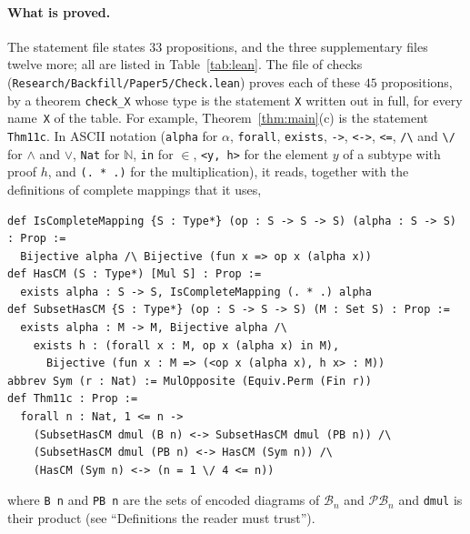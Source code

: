 \documentclass[11pt]{article}
\theoremstyle{remark}
\newcommand{\B}{\mathcal B}
\newcommand{\PB}{\mathcal{PB}}
\begin{document}
\paragraph{What is proved.}
The statement file states $33$ propositions, and the three supplementary files
twelve more; all are listed in Table~\ref{tab:lean}. The file of checks
(\texttt{Research/\allowbreak Backfill/\allowbreak Paper5/\allowbreak Check.lean}) proves each of these $45$
propositions, by a theorem \texttt{check\_X} whose type is the statement
\texttt{X} written out in full, for every name~\texttt{X} of the table. For example,
Theorem~\ref{thm:main}(c) is the statement \texttt{Thm11c}. In ASCII notation
(\verb|alpha| for $\alpha$, \verb|forall|, \verb|exists|, \verb|->|, \verb|<->|, \verb|<=|, \verb|/\| and
\verb|\/| for $\wedge$ and $\vee$, \verb|Nat| for $\mathbb N$, \verb|in| for
$\in$, \verb|<y, h>| for the element $y$ of a subtype with proof $h$, and
\verb|(. * .)| for the multiplication), it reads, together with the definitions
of complete mappings that it uses,
\begin{footnotesize}
\begin{verbatim}
def IsCompleteMapping {S : Type*} (op : S -> S -> S) (alpha : S -> S) : Prop :=
  Bijective alpha /\ Bijective (fun x => op x (alpha x))
def HasCM (S : Type*) [Mul S] : Prop :=
  exists alpha : S -> S, IsCompleteMapping (. * .) alpha
def SubsetHasCM {S : Type*} (op : S -> S -> S) (M : Set S) : Prop :=
  exists alpha : M -> M, Bijective alpha /\
    exists h : (forall x : M, op x (alpha x) in M),
      Bijective (fun x : M => (<op x (alpha x), h x> : M))
abbrev Sym (r : Nat) := MulOpposite (Equiv.Perm (Fin r))
def Thm11c : Prop :=
  forall n : Nat, 1 <= n ->
    (SubsetHasCM dmul (B n) <-> SubsetHasCM dmul (PB n)) /\
    (SubsetHasCM dmul (PB n) <-> HasCM (Sym n)) /\
    (HasCM (Sym n) <-> (n = 1 \/ 4 <= n))
\end{verbatim}
\end{footnotesize}
where \texttt{B n} and \texttt{PB n} are the sets of encoded diagrams of $\B_n$
and $\PB_n$ and \texttt{dmul} is their product (see ``Definitions the reader
must trust'').
\end{document}
